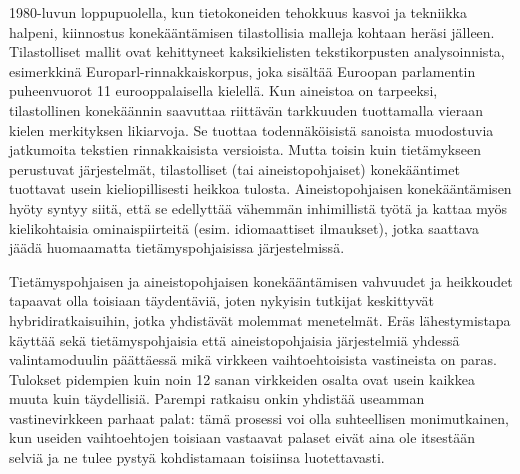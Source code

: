 \documentclass[]{../../metanetpaper}
\begin{document}
\begin{Parallel}[c]{77mm}{77mm}
{1980-luvun loppupuolella, kun tietokoneiden tehokkuus kasvoi ja
tekniikka halpeni, kiinnostus konekääntämisen tilastollisia malleja
kohtaan heräsi jälleen. Tilastolliset mallit ovat kehittyneet
kaksikielisten tekstikorpusten analysoinnista, esimerkkinä
Europarl-rinnakkaiskorpus, joka sisältää Euroopan parlamentin
puheenvuorot 11 eurooppalaisella kielellä. Kun aineistoa on tarpeeksi,
tilastollinen konekäännin saavuttaa riittävän tarkkuuden tuottamalla
vieraan kielen merkityksen likiarvoja. Se tuottaa todennäköisistä
sanoista muodostuvia jatkumoita tekstien rinnakkaisista
versioista. Mutta toisin kuin tietämykseen perustuvat järjestelmät,
tilastolliset (tai aineistopohjaiset) konekääntimet tuottavat usein
kieliopillisesti heikkoa tulosta.  Aineistopohjaisen konekääntämisen
hyöty syntyy siitä, että se edellyttää vähemmän inhimillistä työtä ja
kattaa myös kielikohtaisia ominaispiirteitä (esim. idiomaattiset
ilmaukset), jotka saattava jäädä huomaamatta tietämyspohjaisissa
järjestelmissä.




Tietämyspohjaisen ja aineistopohjaisen konekääntämisen vahvuudet ja
heikkoudet tapaavat olla toisiaan täydentäviä, joten nykyisin tutkijat
keskittyvät hybridiratkaisuihin, jotka yhdistävät molemmat
menetelmät. Eräs lähestymistapa käyttää sekä tietämyspohjaisia että
aineistopohjaisia järjestelmiä yhdessä valintamoduulin päättäessä mikä
virkkeen vaihtoehtoisista vastineista on paras.  Tulokset pidempien
kuin noin 12 sanan virkkeiden osalta ovat usein kaikkea muuta kuin
täydellisiä. Parempi ratkaisu onkin yhdistää useamman vastinevirkkeen
parhaat palat: tämä prosessi voi olla suhteellisen monimutkainen, kun
useiden vaihtoehtojen toisiaan vastaavat palaset eivät aina ole
itsestään selviä ja ne tulee pystyä kohdistamaan toisiinsa
luotettavasti.


}
\end{Parallel}
\end{document}
